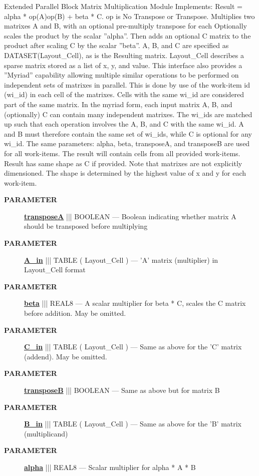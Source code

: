 Extended Parallel Block Matrix Multiplication Module Implements: Result = alpha * op(A)op(B) + beta * C. op is No Transpose or Transpose. Multiplies two matrixes A and B, with an optional pre-multiply transpose for each Optionally scales the product by the scalar ''alpha''. Then adds an optional C matrix to the product after scaling C by the scalar ''beta''. A, B, and C are specified as DATASET(Layout\_Cell), as is the Resulting matrix. Layout\_Cell describes a sparse matrix stored as a list of x, y, and value. This interface also provides a ''Myriad'' capability allowing multiple similar operations to be performed on independent sets of matrixes in parallel. This is done by use of the work-item id (wi\_id) in each cell of the matrixes. Cells with the same wi\_id are considered part of the same matrix. In the myriad form, each input matrix A, B, and (optionally) C can contain many independent matrixes. The wi\_ids are matched up such that each operation involves the A, B, and C with the same wi\_id. A and B must therefore contain the same set of wi\_ids, while C is optional for any wi\_id. The same parameters: alpha, beta, transposeA, and transposeB are used for all work-items. The result will contain cells from all provided work-items. Result has same shape as C if provided. Note that matrixes are not explicitly dimensioned. The shape is determined by the highest value of x and y for each work-item.






\par
\begin{description}
\item [\colorbox{tagtype}{\color{white} \textbf{\textsf{PARAMETER}}}] \textbf{\underline{transposeA}} ||| BOOLEAN --- Boolean indicating whether matrix A should be transposed before multiplying
\item [\colorbox{tagtype}{\color{white} \textbf{\textsf{PARAMETER}}}] \textbf{\underline{A\_in}} ||| TABLE ( Layout\_Cell ) --- 'A' matrix (multiplier) in Layout\_Cell format
\item [\colorbox{tagtype}{\color{white} \textbf{\textsf{PARAMETER}}}] \textbf{\underline{beta}} ||| REAL8 --- A scalar multiplier for beta * C, scales the C matrix before addition. May be omitted.
\item [\colorbox{tagtype}{\color{white} \textbf{\textsf{PARAMETER}}}] \textbf{\underline{C\_in}} ||| TABLE ( Layout\_Cell ) --- Same as above for the 'C' matrix (addend). May be omitted.
\item [\colorbox{tagtype}{\color{white} \textbf{\textsf{PARAMETER}}}] \textbf{\underline{transposeB}} ||| BOOLEAN --- Same as above but for matrix B
\item [\colorbox{tagtype}{\color{white} \textbf{\textsf{PARAMETER}}}] \textbf{\underline{B\_in}} ||| TABLE ( Layout\_Cell ) --- Same as above for the 'B' matrix (multiplicand)
\item [\colorbox{tagtype}{\color{white} \textbf{\textsf{PARAMETER}}}] \textbf{\underline{alpha}} ||| REAL8 --- Scalar multiplier for alpha * A * B
\end{description}







